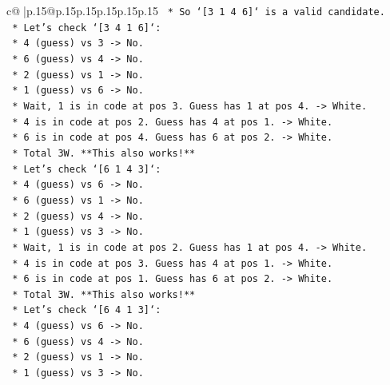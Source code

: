 \documentclass{article}
\begin{document}
{\begin{supertabular}{c@{$\;$}|p{.15\linewidth}@{}p{.15\linewidth}p{.15\linewidth}p{.15\linewidth}p{.15\linewidth}p{.15\linewidth}}
{{{\texttt{                *   So `{[}3 1 4 6{]}` is a valid candidate.} \\
\texttt{                *   Let's check `{[}3 4 1 6{]}`:} \\
\texttt{                    *   4 (guess) vs 3 {-}> No.} \\
\texttt{                    *   6 (guess) vs 4 {-}> No.} \\
\texttt{                    *   2 (guess) vs 1 {-}> No.} \\
\texttt{                    *   1 (guess) vs 6 {-}> No.} \\
\texttt{                    *   Wait, 1 is in code at pos 3. Guess has 1 at pos 4. {-}> White.} \\
\texttt{                    *   4 is in code at pos 2. Guess has 4 at pos 1. {-}> White.} \\
\texttt{                    *   6 is in code at pos 4. Guess has 6 at pos 2. {-}> White.} \\
\texttt{                    *   Total 3W. **This also works!**} \\
\texttt{                *   Let's check `{[}6 1 4 3{]}`:} \\
\texttt{                    *   4 (guess) vs 6 {-}> No.} \\
\texttt{                    *   6 (guess) vs 1 {-}> No.} \\
\texttt{                    *   2 (guess) vs 4 {-}> No.} \\
\texttt{                    *   1 (guess) vs 3 {-}> No.} \\
\texttt{                    *   Wait, 1 is in code at pos 2. Guess has 1 at pos 4. {-}> White.} \\
\texttt{                    *   4 is in code at pos 3. Guess has 4 at pos 1. {-}> White.} \\
\texttt{                    *   6 is in code at pos 1. Guess has 6 at pos 2. {-}> White.} \\
\texttt{                    *   Total 3W. **This also works!**} \\
\texttt{                *   Let's check `{[}6 4 1 3{]}`:} \\
\texttt{                    *   4 (guess) vs 6 {-}> No.} \\
\texttt{                    *   6 (guess) vs 4 {-}> No.} \\
\texttt{                    *   2 (guess) vs 1 {-}> No.} \\
\texttt{                    *   1 (guess) vs 3 {-}> No.} \\
}}}
\end{supertabular}}
\end{document}
